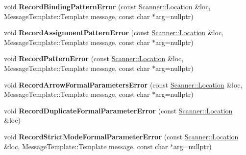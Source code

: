 \begin{DoxyCompactItemize}
\item 
void {\bfseries Record\+Binding\+Pattern\+Error} (const \hyperlink{structv8_1_1internal_1_1_scanner_1_1_location}{Scanner\+::\+Location} \&loc, Message\+Template\+::\+Template message, const char $\ast$arg=nullptr)\hypertarget{classv8_1_1internal_1_1_expression_classifier_a04c7e3dc9fd7290259d813f9185ddccb}{}\label{classv8_1_1internal_1_1_expression_classifier_a04c7e3dc9fd7290259d813f9185ddccb}

\item 
void {\bfseries Record\+Assignment\+Pattern\+Error} (const \hyperlink{structv8_1_1internal_1_1_scanner_1_1_location}{Scanner\+::\+Location} \&loc, Message\+Template\+::\+Template message, const char $\ast$arg=nullptr)\hypertarget{classv8_1_1internal_1_1_expression_classifier_ad1e5bff1fa383231e707d06a94ceefe8}{}\label{classv8_1_1internal_1_1_expression_classifier_ad1e5bff1fa383231e707d06a94ceefe8}

\item 
void {\bfseries Record\+Pattern\+Error} (const \hyperlink{structv8_1_1internal_1_1_scanner_1_1_location}{Scanner\+::\+Location} \&loc, Message\+Template\+::\+Template message, const char $\ast$arg=nullptr)\hypertarget{classv8_1_1internal_1_1_expression_classifier_a1ee607ab53d730c7d48b2f88941c9650}{}\label{classv8_1_1internal_1_1_expression_classifier_a1ee607ab53d730c7d48b2f88941c9650}

\item 
void {\bfseries Record\+Arrow\+Formal\+Parameters\+Error} (const \hyperlink{structv8_1_1internal_1_1_scanner_1_1_location}{Scanner\+::\+Location} \&loc, Message\+Template\+::\+Template message, const char $\ast$arg=nullptr)\hypertarget{classv8_1_1internal_1_1_expression_classifier_aaac2a9240440e9139e70ff023b9332f7}{}\label{classv8_1_1internal_1_1_expression_classifier_aaac2a9240440e9139e70ff023b9332f7}

\item 
void {\bfseries Record\+Duplicate\+Formal\+Parameter\+Error} (const \hyperlink{structv8_1_1internal_1_1_scanner_1_1_location}{Scanner\+::\+Location} \&loc)\hypertarget{classv8_1_1internal_1_1_expression_classifier_a6d13ab2e8a753e668df8dc8987116a4f}{}\label{classv8_1_1internal_1_1_expression_classifier_a6d13ab2e8a753e668df8dc8987116a4f}

\item 
void {\bfseries Record\+Strict\+Mode\+Formal\+Parameter\+Error} (const \hyperlink{structv8_1_1internal_1_1_scanner_1_1_location}{Scanner\+::\+Location} \&loc, Message\+Template\+::\+Template message, const char $\ast$arg=nullptr)\hypertarget{classv8_1_1internal_1_1_expression_classifier_a08c64a14516f1180a37a2f9351f39ecc}{}\label{classv8_1_1internal_1_1_expression_classifier_a08c64a14516f1180a37a2f9351f39ecc}


\end{DoxyCompactItemize}
